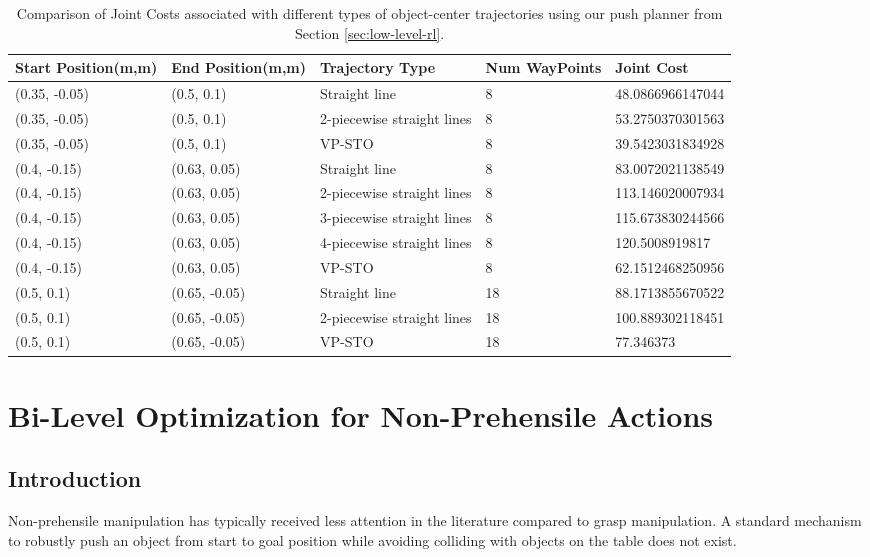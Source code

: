 \begin{table}
\centering
\caption{Comparison of Joint Costs associated with different types of object-center trajectories using our push planner from Section \ref{sec:low-level-rl}.} \label{table: straight-line-vs-joint}
\scriptsize
\begin{tabular}{|p{2cm}|p{2cm}|p{4cm}|p{2cm}|p{3cm}|}\hline
 Start Position(m,m) & End Position(m,m) & Trajectory Type & Num WayPoints & Joint Cost
\\ \hline
(0.35, -0.05) & (0.5, 0.1) & Straight line & 8	& 48.0866966147044 
\\ \hline
(0.35, -0.05) & (0.5, 0.1)	& 2-piecewise straight lines & 8 & 53.2750370301563
\\ \hline
(0.35, -0.05) & (0.5, 0.1)	& VP-STO		& 8	& 	39.5423031834928
\\ \hline
(0.4, -0.15) & (0.63, 0.05)	& Straight line	& 8	& 83.0072021138549
\\ \hline
(0.4, -0.15) & (0.63, 0.05)	& 2-piecewise straight lines & 8 & 113.146020007934
\\ \hline
(0.4, -0.15) & (0.63, 0.05)	& 3-piecewise straight lines & 8 & 115.673830244566
\\ \hline
(0.4, -0.15) & (0.63, 0.05) & 4-piecewise straight lines & 8 & 120.5008919817
\\ \hline
(0.4, -0.15) & (0.63, 0.05)	& VP-STO	& 8	& 62.1512468250956
\\ \hline
(0.5, 0.1)	& (0.65, -0.05)	& Straight line	& 18 & 88.1713855670522
\\ \hline
(0.5, 0.1)	& (0.65, -0.05)	& 2-piecewise straight lines & 18 & 100.889302118451
\\ \hline
(0.5, 0.1)	& (0.65, -0.05)	& VP-STO & 18 & 77.346373
\\ \hline
\end{tabular}
\normalsize
\vspace{-0.1cm}
\end{table}

\section{Bi-Level Optimization for Non-Prehensile Actions}\label{sec:bi-level-method}

\subsection{Introduction}
 Non-prehensile manipulation has typically received less attention in the literature compared to grasp manipulation. A standard mechanism to robustly push an object from start to goal position while avoiding colliding with objects on the table does not exist. 

